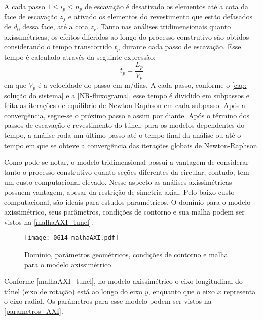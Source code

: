 A cada passo $1 \leq i_p \leq n_p$ de escavação é desativado os elementos até a cota da face de escavação $z_f$ e ativado os elementos do revestimento que estão defasados de $d_0$ dessa face, até a cota $z_r$. Tanto nas análises tridimensionais quanto axissimétricas, os efeitos diferidos ao longo do processo construtivo são obtidos considerando o tempo transcorrido $t_p$ durante cada passo de escavação. Esse tempo é calculado através da seguinte expressão:
\begin{equation}
	\label{eq:tp}
	t_p = \dfrac{L_p}{V_p}
\end{equation}
em que $V_p$ é a velocidade do passo em m/dias. A cada passo, conforme o \autoref{cap: solução do sistema} e a \autoref{NR-fluxograma}, esse tempo é dividido em subpassos e feita as iterações de equilíbrio de Newton-Raphson em cada subpasso. Após a convergência, segue-se o próximo passo e assim por diante. Após o término dos passos de escavação e revestimento do túnel, para os modelos dependentes do tempo, a análise roda um último passo até o tempo final da análise ou até o tempo em que se obteve a convergência das iterações globais de Newton-Raphson.

Como pode-se notar, o modelo tridimensional possui a vantagem de considerar tanto o processo construtivo quanto seções diferentes da circular, contudo, tem um custo computacional elevado. Nesse aspecto as análises axissimétricas possuem vantagem, apesar da restrição de simetria axial. Pelo baixo custo computacional, são ideais para estudos paramétricos. O domínio para o modelo axissimétrico, seus parâmetros, condições de contorno e sua malha podem ser vistos na \autoref{malhaAXI_tunel}.

\begin{figure}[H]
	\begin{center}
		\texttt{[image: 0614-malhaAXI.pdf]}
	\end{center}
	\caption{\label{malhaAXI_tunel}Domínio, parâmetros geométricos, condições de contorno e malha para o modelo axissimétrico}
\end{figure}

Conforme \autoref{malhaAXI_tunel}, no modelo axissimétrico o eixo longitudinal do túnel (eixo de rotação) está ao longo do eixo $y$, enquanto que o eixo $x$ representa o eixo radial. Os parâmetros para esse modelo podem ser vistos na \autoref{parametros_AXI}.


